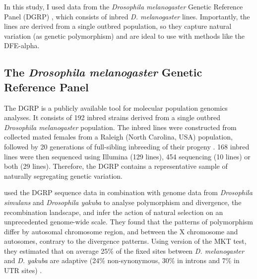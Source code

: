 In this study, I used data from the \textit{Drosophila melanogaster} Genetic Reference Panel (DGRP) \citep{Mackay2012}, which consists of inbred \textit{D. melanogaster} lines.
Importantly, the lines are derived from a single outbred population, so they capture natural variation (as genetic polymorphism) and are ideal to use with methods like the DFE-alpha. 



\subsection{The \textit{Drosophila melanogaster} Genetic Reference Panel}

The DGRP is a publicly available tool for molecular population genomics analyses.
%
It consists of 192 inbred strains derived from a single outbred \textit{Drosophila melanogaster} population.
The inbred lines were constructed from collected mated females from a Raleigh (North Carolina, USA) population, followed by 20 generations of full-sibling inbreeding of their progeny \citep{Mackay2012}.
168 inbred lines were then sequenced using Illumina (129 lines), 454 sequencing (10 lines) or both (29 lines). Therefore, the DGRP contains a representative sample of naturally segregating genetic variation.

\citealp{Mackay2012} used the DGRP sequence data in combination with genome data from \textit{Drosophila simulans} and \textit{Drosophila yakuba} to analyse polymorphism and divergence, the recombination landscape, and infer the action of natural selection on an unprecedented genome-wide scale.
They found that the patterns of polymorphism differ by autosomal chromosome region, and between the X chromosome and autosomes, contrary to the divergence patterns.
Using version of the MKT test, they estimated that on average 25\% of the fixed sites between \textit{D. melanogaster} and \textit{D. yakuba} are adaptive (24\% non-synonymous, 30\% in introns and 7\% in UTR sites) \citep{Mackay2012}.